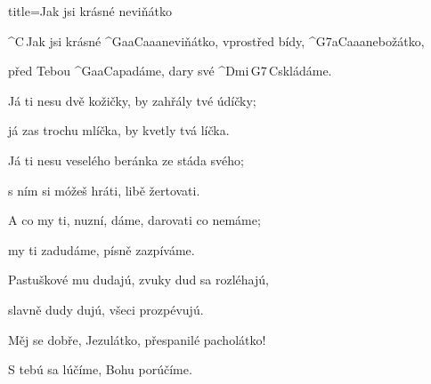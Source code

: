 \begin{song}{title=\predtitle\centering Jak jsi krásné neviňátko \\\large   \vspace*{-0.3cm}}  %
\begin{centerjustified}
\nejnejvetsi

\sloka
	^{C\,}Jak jsi krásné ^{G{\color{white}aa}C{\color{white}aaa}}neviňátko, vprostřed bídy, ^{G7{\color{white}a}C{\color{white}aaa}}nebožátko,

	před Tebou ^{G{\color{white}aa}C{\color{white}a}}padáme, dary své ^{Dmi\,G7\,C}skládáme.

\sloka
	Já ti nesu dvě kožičky, by zahřály tvé údíčky;

	já zas trochu mlíčka, by kvetly tvá líčka.

\sloka
	Já ti nesu veselého beránka ze stáda svého;

	s ním si móžeš hráti, libě žertovati.

\sloka
	A co my ti, nuzní, dáme, darovati co nemáme;

	my ti zadudáme, písně zazpíváme.

\sloka
	Pastuškové mu dudajú, zvuky dud sa rozléhajú,

	slavně dudy dujú, všeci prozpévujú.

\sloka
	Měj se dobře, Jezulátko, přespanilé pacholátko!

	S tebú sa lúčíme, Bohu porúčíme.



\end{centerjustified}
\setcounter{Slokočet}{0}
\end{song}

